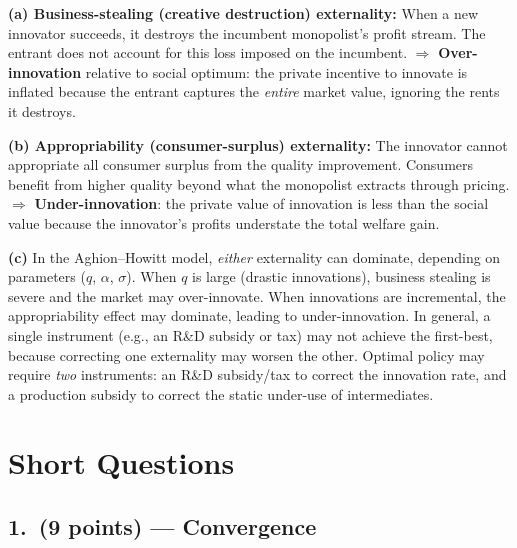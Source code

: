 \documentclass[a4paper,11pt]{article}
\begin{document}
\begin{answerbox}
\textbf{(a) Business-stealing (creative destruction) externality:}
When a new innovator succeeds, it destroys the incumbent monopolist's profit stream.
The entrant does not account for this loss imposed on the incumbent.
$\Rightarrow$ \textbf{Over-innovation} relative to social optimum: the private incentive
to innovate is inflated because the entrant captures the \emph{entire} market value,
ignoring the rents it destroys.

\textbf{(b) Appropriability (consumer-surplus) externality:}
The innovator cannot appropriate all consumer surplus from the quality improvement.
Consumers benefit from higher quality beyond what the monopolist extracts through pricing.
$\Rightarrow$ \textbf{Under-innovation}: the private value of innovation is less than
the social value because the innovator's profits understate the total welfare gain.

\textbf{(c)} In the Aghion--Howitt model, \emph{either} externality can dominate,
depending on parameters ($q$, $\alpha$, $\sigma$).  When $q$ is large (drastic
innovations), business stealing is severe and the market may over-innovate.  When
innovations are incremental, the appropriability effect may dominate, leading to
under-innovation.  In general, a single instrument (e.g., an R\&D subsidy or tax)
may not achieve the first-best, because correcting one externality may worsen the other.
Optimal policy may require \emph{two} instruments: an R\&D subsidy/tax to correct the
innovation rate, and a production subsidy to correct the static under-use of intermediates.
\end{answerbox}

\clearpage
\section{Short Questions}

\subsection*{1.\ (9 points) --- Convergence}
\end{document}
